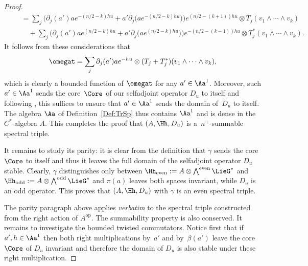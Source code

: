 \begin{proof}
\begin{gather*}
\qquad{}
= \sum_j \big(\partial_j( a') a e^{-(n/2 - k)h u} + a' \partial_j\big(a e^{-(n/2 - k)h u}\big)\big) e^{(n/2 - (k+1))h u}
\otimes T_j( v_1 \wedge \cdots \wedge v_k) \\
\qquad\quad{}
+ \sum_j \big(\partial_j( a') a e^{(n/2 - k)h u} + a' \partial_j\big(a e^{(n/2 - k)h u}\big)\big) e^{-(n/2 - (k-1))h u} \otimes T_j^*( v_1 \wedge \cdots \wedge v_k).
\end{gather*}
It follows from these considerations that
\begin{gather*}
[D_u, a'] \omegat = \sum_j \partial_j(a') a e^{-h u} \otimes (T_j + T_j^*)( v_1 \wedge \cdots \wedge v_k),
\end{gather*}
which is clearly a bounded function of $\omegat$ for any $a' \in \Aa^1$. Moreover, such $a' \in \Aa^1$ sends the core~$\Core$ of our selfadjoint operator $D_u$ to itself and following \cite[Proposition~A.1, p.~293]{TrSpPiCr-Paterson}, this suf\/f\/ices to ensure that $a' \in \Aa^1$ sends the domain of~$D_u$ to itself. The algebra $\Aa$ of Def\/inition~\ref{Def:TrSp} thus contains $\Aa^1$ and is dense in the $C^*$-algebra $A$. This completes the proof that $(A, \Hh, D_u)$ is a~$n^+$-summable spectral triple.

It remains to study its parity: it is clear from the def\/inition that $\gamma$ sends the core $\Core$ to itself and thus it leaves the full domain of the selfadjoint operator $D_u$ stable. Clearly, $\gamma$ distinguishes only between $\Hh_\text{even} := A \otimes \bigwedge^\text{even} \LieG^*$ and $\Hh_\text{odd} := A \otimes \bigwedge^\text{odd} \LieG^*$ and $\pi(a)$ leaves both spaces invariant, while $D_u$ is an odd operator. This proves that $(A, \Hh, D_u)$ with $\gamma$ is an even spectral triple.

The parity paragraph above applies \textit{verbatim} to the spectral triple constructed from the right action of $A^\text{op}$. The summability property is also conserved. It remains to investigate the bounded twisted commutators. Notice f\/irst that if $a', h \in \Aa^1$ then both right multiplications by~$a'$ and by~$\beta(a')$ leave the core $\Core$ of $D_u$ invariant and therefore the domain of $D_u$ is also stable under these right multiplication.


\end{proof}
